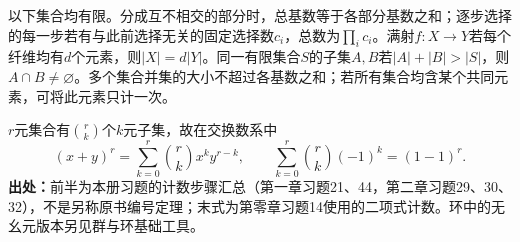 \begin{reviewlemma}[有限集计数与二项式计数]\label{tool:n-binomial-count}
以下集合均有限。分成互不相交的部分时，总基数等于各部分基数之和；逐步选择的每一步若有与此前选择无关的固定选择数$c_i$，总数为$\prod_i c_i$。满射$f:X\to Y$若每个纤维均有$d$个元素，则$|X|=d|Y|$。同一有限集合$S$的子集$A,B$若$|A|+|B|>|S|$，则$A\cap B\ne\varnothing$。多个集合并集的大小不超过各基数之和；若所有集合均含某个共同元素，可将此元素只计一次。

$r$元集合有$\binom rk$个$k$元子集，故在交换数系中
\[
(x+y)^r=\sum_{k=0}^r\binom rkx^ky^{r-k},\qquad
\sum_{k=0}^r\binom rk(-1)^k=(1-1)^r.
\]
\textbf{出处：}前半为本册习题的计数步骤汇总（第一章习题21、44，第二章习题29、30、32），不是另称原书编号定理；末式为第零章习题14使用的二项式计数。环中的无幺元版本另见群与环基础工具。
\end{reviewlemma}
